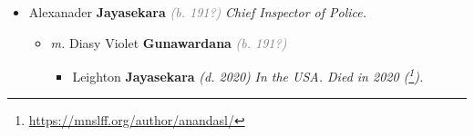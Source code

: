 \documentclass[10pt, openany]{book}
\begin{document}
\begin{itemize}
{\begin{itemize}
{\begin{itemize}
{\begin{itemize}
{\begin{itemize}
{\begin{itemize}
\end{itemize}}
\end{itemize}
 }
\item{Brighty \textbf{Jayasekara} \textcolor{gray}{\textit{(b. 194?)}} \textcolor{slmaroon}{\textit{Bank Manager UK.}}
\begin{itemize}
\item{\textit{m.} Sirima Lakshmi Wickramasingha \textbf{Wickramatilleka} \textcolor{slorange}{\textit{(d. 2022)}} \textcolor{slmaroon}{\textit{Died in 2022 (\footnote{\url{https://www.dailynews.lk/2022/03/08/obituaries/274304/obituaries}}).}} Daughter of  Percy \textbf{Wickramatilleka} \textcolor{gray}{\textit{(b. 190?)}} \textcolor{slteal}{\textit{See  \autoref{00000981} \textit{, p. \pageref{00000981} }}}  \&  Lily \textbf{Wijesinghe} \textcolor{gray}{\textit{(b. 191?)}} \textcolor{slteal}{\textit{See  \autoref{00001002} \textit{, p. \pageref{00001002} }}}   \label{couple:00000285:00000982} \begin{itemize}
\item{Shanthi \textbf{Jayasekara} \textcolor{gray}{\textit{(b. 197?)}} \textcolor{slmaroon}{\textit{Graduate.}}
 }
\item{Sudantha \textbf{Jayasekara} \textcolor{gray}{\textit{(b. 197?)}}
 }
\item{Arundani \textbf{Jayasekara} \textcolor{gray}{\textit{(b. 197?)}}
 }
\item{Keshani \textbf{Jayasekara} \textcolor{gray}{\textit{(b. 198?)}}
 }
\end{itemize}}
\end{itemize}
 }
\end{itemize}}
\end{itemize}
 }
\item{Alexanader \textbf{Jayasekara} \textcolor{gray}{\textit{(b. 191?)}} \textcolor{slmaroon}{\textit{Chief Inspector of Police.}}
\begin{itemize}
\item{\textit{m.} Diasy Violet \textbf{Gunawardana} \textcolor{gray}{\textit{(b. 191?)}}   \label{couple:00000238:00000272} \begin{itemize}
\item{Leighton \textbf{Jayasekara} \textcolor{slorange}{\textit{(d. 2020)}} \textcolor{slmaroon}{\textit{In the USA.
Died in 2020 (\footnote{\url{https://mnslff.org/author/anandasl/}}).}}
}
\end{itemize}}
\end{itemize}}
\end{itemize}}
\end{itemize}
\end{document}
